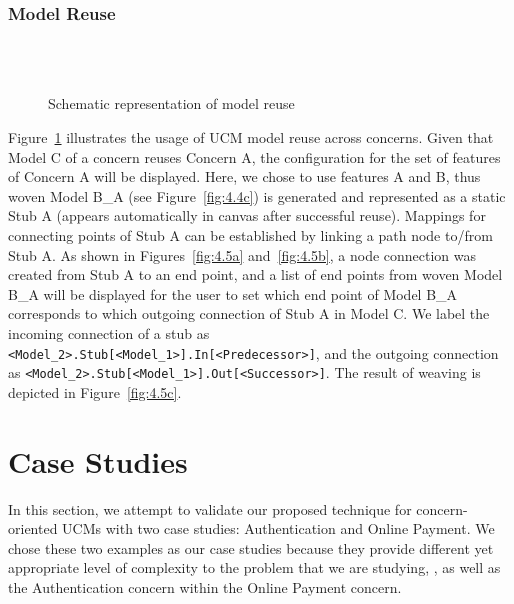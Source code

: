 \subsubsection{Model Reuse}

\begin{figure}
	\centering
	 \\
	 \\
	\caption{Schematic representation of model reuse}
	\label{fig:4.5}
\end{figure}

Figure~\ref{fig:4.5} illustrates the usage of UCM model reuse across concerns. Given that Model C of a concern reuses Concern A, the configuration for the set of features of Concern A will be displayed. Here, we chose to use features A and B, thus woven Model B\_A (see Figure~\ref{fig:4.4c}) is generated and represented as a static Stub A (appears automatically in canvas after successful reuse). Mappings for connecting points of Stub A can be established by linking a path node to/from Stub A. As shown in Figures~\ref{fig:4.5a} and~\ref{fig:4.5b}, a node connection was created from Stub A to an end point, and a list of end points from woven Model B\_A will be displayed for the user to set which end point of Model B\_A corresponds to which outgoing connection of Stub A in Model C. We label the incoming connection of a stub as \verb|<Model_2>.Stub[<Model_1>].In[<Predecessor>]|, and the outgoing connection as \verb|<Model_2>.Stub[<Model_1>].Out[<Successor>]|. The result of weaving  is depicted in Figure~\ref{fig:4.5c}.

\section{Case Studies} \label{sec:4.2}

In this section, we attempt to validate our proposed technique for concern-oriented UCMs with two case studies: Authentication and Online Payment. We chose these two examples as our case studies because they provide different yet appropriate level of complexity to the problem that we are studying, , as well as  the Authentication concern within the Online Payment concern.

